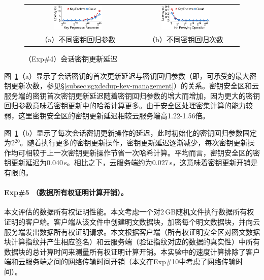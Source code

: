 \begin{figure}[!htb]
    \centering
    \begin{tabular}{@{\ }c@{\ }c}
    \includegraphics[width=0.48\textwidth]{pic/sgxdedup/expa5_keyRegression_time.pdf} &
    \includegraphics[width=0.48\textwidth]{pic/sgxdedup/expa5_keyRegression_time_default.pdf} \\
    \mbox{\small （a）不同密钥回归参数} &
    \mbox{\small （b）不同密钥回归次数}
    \end{tabular}
    \caption{（Exp\#4）会话密钥更新延迟}
    \label{fig:sgxdedup-rekeyingLatency}
\end{figure}
    
图~\ref{fig:sgxdedup-rekeyingLatency}（a）显示了会话密钥的首次更新延迟与密钥回归参数（即，可承受的最大密钥更新次数，参见\S\ref{subsec:sgxdedup-key-management}）的关系。密钥安全区和云服务端的密钥首次密钥更新延迟随着密钥回归参数的增大而增加，因为更大的密钥回归参数意味着密钥更新中的哈希计算更多。由于安全区处理密集计算的能力较弱\cite{harnik2018SGX}，这里密钥安全区的密钥更新延迟相较云服务端高1.22-1.56倍。

图~\ref{fig:sgxdedup-rekeyingLatency}（b）显示了每次会话密钥更新操作的延迟，此时初始化的密钥回归参数固定为2$^{20}$。随着执行更多的密钥更新操作，密钥更新延迟逐渐减少，每次密钥更新操作均可相较于上一次密钥更新操作节省一次哈希计算。平均而言，密钥安全区的密钥更新延迟为0.040\,s。相比之下，云服务端约为0.027\,s，这意味着密钥更新开销是有限的。

\paragraph*{Exp\#5 （数据所有权证明计算开销）。}本文评估\sysnameS 的数据所有权证明性能。本文考虑一个对2\,GB随机文件执行数据所有权证明的客户端。客户端从该文件中创建明文数据块，加密每个明文数据块，并向云服务端发出数据所有权证明请求。本文根据客户端（所有权证明安全区对密文数据块计算指纹并产生相应签名）和云服务端（验证指纹对应的数据的真实性）中所有数据块的总计算时间来测量所有权证明计算开销。本实验中的速度计算排除了客户端和云服务端之间的网络传输时间开销（本文在Exp\#10中考虑了网络传输时间）。

